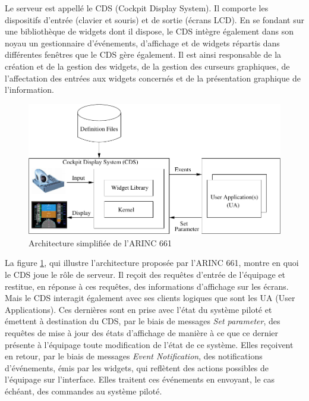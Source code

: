 \documentclass{ihm}
\begin{document}
Le serveur est  appellé le CDS (Cockpit Display  System).  Il comporte
les  dispositifs d'entrée  (clavier et  souris) et  de sortie  (écrans
LCD).  En se fondant sur une  bibliothèque de widgets dont il dispose,
le CDS intègre également dans  son noyau un gestionnaire d'événements,
d'affichage et  de widgets répartis  dans différentes fenêtres  que le
CDS gère également.  Il est ainsi responsable de la  création et de la
gestion  des  widgets,  de  la gestion  des  curseurs  graphiques,  de
l'affectation des entrées aux widgets  concernés et de la présentation
graphique de l'information.

\begin{figure}[tb!] 
\begin{center}
\includegraphics [scale = 0.52]{ARINC}
\end{center}
\caption{Architecture simplifiée de l'ARINC 661}
\label{fig:arinc} 
\end{figure}

La figure  \ref{fig:arinc}, qui  illustre l'architecture  proposée par
l'ARINC 661, montre en quoi le CDS  joue le rôle de serveur. Il reçoit
des  requêtes d'entrée  de l'équipage  et restitue,  en réponse  à ces
requêtes, des  informations d'affichage  sur les  écrans. Mais  le CDS
interagit également  avec ses clients  logiques que sont les  UA (User
Applications).  Ces  dernières sont  en prise  avec l'état  du système
piloté et  émettent à  destination du  CDS, par  le biais  de messages
\emph{Set  parameter},  des   requêtes  de  mise  à   jour  des  états
d'affichage de manière à ce que ce dernier présente à l'équipage toute
modification de l'état  de ce système. Elles reçoivent  en retour, par
le  biais de  messages  \emph{Event  Notification}, des  notifications
d'événements,  émis  par  les   widgets,  qui  reflètent  des  actions
possibles de l'équipage sur l'interface. Elles traitent ces événements
en envoyant, le cas échéant, des commandes au système piloté.
\end{document}
